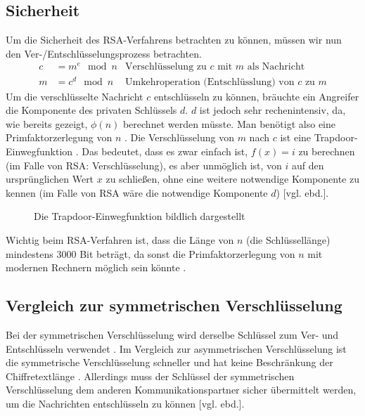 \documentclass[a4paper,ngerman, headheight=28pt,12pt]{scrartcl}
\newcommand{\vcite}[1]{\cite[vgl.][]{#1}}
\newcommand{\vebd}{[vgl. ebd.]}
\begin{document}
\subsection{Sicherheit}

Um die Sicherheit des RSA-Verfahrens betrachten zu können, müssen wir nun den Ver-/Entschlüsselungsprozess betrachten.
\begin{equation*}
  \begin{aligned}
    c & = m^e \mod n & \text{Verschlüsselung zu $c$ mit $m$ als Nachricht}    \\
    m & = c^d \mod n & \text{Umkehroperation (Entschlüsslung) von $c$ zu $m$}
  \end{aligned}
\end{equation*}
Um die verschlüsselte Nachricht $c$ entschlüsseln zu können, bräuchte ein Angreifer die Komponente des privaten Schlüssels $d$. $d$ ist jedoch sehr rechenintensiv, da, wie bereits gezeigt, $\phi(n)$ berechnet werden müsste. Man benötigt also eine Primfaktorzerlegung von $n$ \vcite{EulersTotientFunction}. Die Verschlüsselung von $m$ nach $c$ ist eine Trapdoor-Einwegfunktion \vcite{RsaTrapdoor}. Das bedeutet, dass es zwar einfach ist, $f(x) = i$ zu berechnen (im Falle von RSA: Verschlüsselung), es aber unmöglich ist, von $i$ auf den ursprünglichen Wert $x$ zu schließen, ohne eine weitere notwendige Komponente zu kennen (im Falle von RSA wäre die notwendige Komponente $d$) \vebd.
\begin{figure}[h]
  \centering
  
  \caption{Die Trapdoor-Einwegfunktion bildlich dargestellt\vcite{fig:TrapdoorPermutation} \label{fig:TrapdoorFunc}}
\end{figure}
Wichtig beim RSA-Verfahren ist, dass die Länge von $n$ (die Schlüssellänge) mindestens 3000 Bit beträgt, da sonst die Primfaktorzerlegung von $n$ mit modernen Rechnern möglich sein könnte \vcite{RsaKeyLength}.
\subsection{Vergleich zur symmetrischen Verschlüsselung}
Bei der symmetrischen Verschlüsselung wird derselbe Schlüssel zum Ver- und Entschlüsseln verwendet \vcite{GeneralSymmetricCryptography}.
Im Vergleich zur asymmetrischen Verschlüsselung ist die symmetrische Verschlüsselung schneller und hat keine Beschränkung der Chiffretextlänge \vcite{RsaAESAnalysis, OpensslRsaMaxLength}. Allerdings muss der Schlüssel der symmetrischen Verschlüsselung dem anderen Kommunikationspartner sicher übermittelt werden, um die Nachrichten entschlüsseln zu können \vebd.
\end{document}
